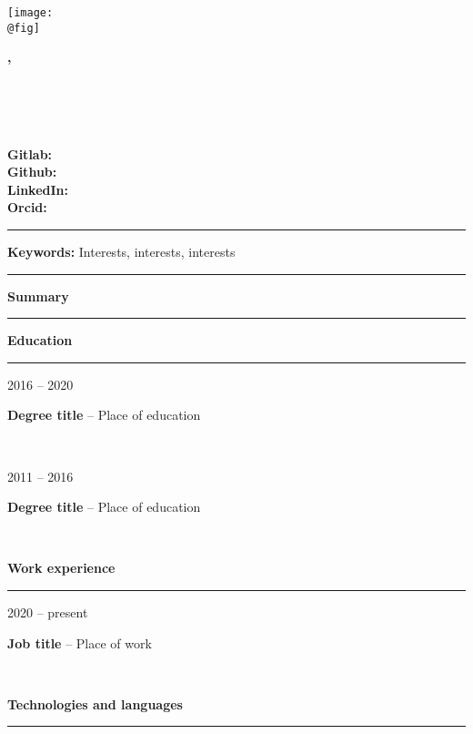 \documentclass[10pt,A4]{article}
\author{Jane Doe}
\date{\today}
\makeatletter
\newcommand{\cvsection}[1]
{
    \begin{center}
	    \large\textcolor{maincolor}{\textbf{#1}}
	    \vspace{0.2cm}
	    \textcolor{sepcolor}{\hrule}
    \end{center}
}
\newcommand{\cvitem}[4] %
{
\begin{minipage}[t]{.15\textwidth} 
\centering
   \textcolor{maincolor}{#1} 
\end{minipage}
    \hfill
    \noindent
\begin{minipage}[t]{.82\textwidth}
{\textbf{#2}} -- \textcolor{maincolor}{#3}\\
{#4}
\end{minipage}\\
\vspace{0.2cm}
}
\newcommand{\cvkeywords}[1] 
{
\centering
\vspace{0.4cm}
\textcolor{sepcolor}{\hrule}
{\textcolor{maincolor}{\large\textbf{Keywords: }}#1}\\
\textcolor{sepcolor}{\hrule}
\raggedright
}
\newcommand{\cvtitle}
{
\begin{minipage}{.30\textwidth}
\centering
    \texttt{[image: \\@fig]}
\end{minipage}
    \hfill
    \noindent
\begin{minipage}{.68\textwidth}
\raggedright 
    {\textcolor{maincolor}{\huge\textbf{\@author, \@degree}}}\\
    \vspace{0.2cm}
    \begin{minipage}{.48\textwidth}
	    {{\@date}}\\
	    {{\@address}}\\
        {{\@phone}}\\
	    {{\@email}}
	\end{minipage}
    \hfill
    \noindent
    \begin{minipage}{.48\textwidth}
        \raggedright
	    \textbf{Gitlab:} \@gitlab\\
	    \textbf{Github:} \@github\\
	    \textbf{LinkedIn:} \@linkedin\\
	    \textbf{Orcid:} \@orcid
	\end{minipage}
	\vspace{0.2cm}
\end{minipage}
\vspace{0.2cm}
}
\makeatother
\begin{document}
\cvtitle
\cvkeywords{Interests, interests, interests}
\cvsection{Summary}
\lipsum[1-1]

\cvsection{Education}
\cvitem{2016 -- 2020}{Degree title}{Place of education}{\lipsum[1-1]}
\cvitem{2011 -- 2016}{Degree title}{Place of education}{\lipsum[1-1]}
\clearpage %
\cvsection{Work experience}
\cvitem{2020 -- present}{Job title}{Place of work}{\lipsum[1-1]}
\cvsection{Technologies and languages}
{\lipsum[1-1]}
\end{document}
